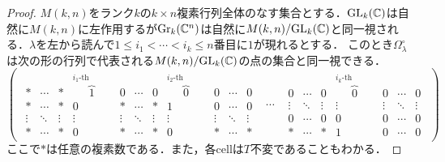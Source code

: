 \begin{proof}
  $M(k,n)$をランク$k$の$k\times n$複素行列全体のなす集合とする．$\text{GL}_k(\mathbb{C})$は自然に$M(k, n)$に左作用するが$\text{Gr}_k(\mathbb{C}^n)$は自然に$M(k,n)/\text{GL}_k(\mathbb{C})$と同一視される．$\lambda$を左から読んで$1\leq i_1<\cdots<i_k\leq n$番目に$1$が現れるとする．
  このとき$\Omega_\lambda^\circ$は次の形の行列で代表される$M(k,n)/\text{GL}_k(\mathbb{C})$の点の集合と同一視できる．
  \small
  \begin{equation}\label{row echelon form}
  \left(\begin{array}{ccc}
    {\begin{array}{ccccccccccc}
    * & \cdots & * & \overbrace{1}^{i_1\text{-th column}} & 0 & \cdots & 0 & \overbrace{0}^{i_{2}\text{-th column}} & 0 & \cdots & 0\\
    * & \cdots & * & 0 & * & \cdots & * & 1 & 0 & \cdots & 0\\
    \vdots & \ddots & \vdots & \vdots & \vdots & \ddots & \vdots & \vdots & \vdots & \ddots & \vdots\\
    * & \cdots & * & 0 & * & \cdots & * & 0 & * & \cdots & * 
    \end{array}} & \cdots & 
    {\begin{array}{ccccccc}
    0 & \cdots & 0 & \overbrace{0}^{i_{k}\text{-th column}} & 0 &\cdots & 0\\
    \vdots & \ddots & \vdots & \vdots & \vdots & \ddots & \vdots\\
    0 & \cdots & 0 & 0 & 0 & \cdots & 0\\
    * & \cdots & * & 1 & 0 & \cdots & 0
    \end{array}}
  \end{array}\right)
  \end{equation}
  \normalsize
  ここで$*$は任意の複素数である．また，各cellは$T$不変であることもわかる．


\end{proof}

